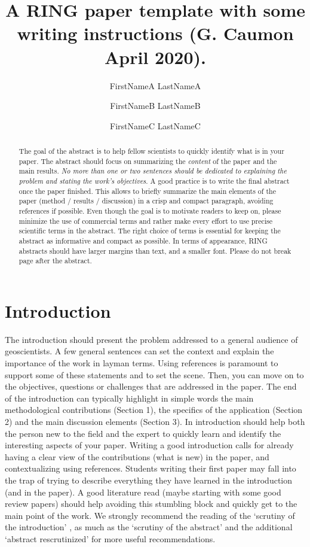 \documentclass[final]{ring}
\title{A RING paper template with some writing instructions \newline (G. Caumon April 2020).}
\author[1]{FirstNameA LastNameA}
\author[2]{FirstNameB LastNameB}
\author[1,2]{FirstNameC LastNameC}
\affil[1]{RING, GeoRessources / ENSG, Universit\'e de Lorraine / CNRS, F-54000 Nancy}
\affil[2]{Team, Laboratory, Organization, Zip code, Country}
\begin{document}
\maketitle

\begin{abstract}

The goal of the abstract is to help fellow scientists to quickly identify what is in your paper. The abstract should focus on summarizing the \emph{content} of the paper and the main results. \emph{No more than one or two sentences should be dedicated to explaining the problem and stating the work’s objectives}. A good practice is to write the final abstract once the paper finished. This allows to briefly summarize the main elements of the paper (method / results / discussion) in a crisp and compact paragraph, avoiding references if possible. Even though the goal is to motivate readers to keep on, please minimize the use of commercial terms and rather make every effort to use precise scientific terms in the abstract. The right choice of terms is essential for keeping the abstract as informative and compact as possible. In terms of appearance, RING abstracts should have larger margins than text, and a smaller font. Please do not break page after the abstract.

\end{abstract}


\section*{Introduction}

The introduction should present the problem addressed to a general audience of geoscientists. A few general sentences can set the context and explain the importance of the work in layman terms. Using references is paramount to support some of these statements and to set the scene. Then, you can move on to the objectives, questions or challenges that are addressed in the paper. The end of the introduction can typically highlight in simple words the main methodological contributions (Section 1), the specifics of the application (Section 2) and the main discussion elements (Section 3). 
In introduction should help both the person new to the field and the expert to quickly learn and identify the interesting aspects of your paper. Writing a good introduction calls for already having a clear view of the contributions (what is new) in the paper, and contextualizing using references. Students writing their first paper may fall into the trap of trying to describe everything they have learned in the introduction (and in the paper). A good literature read (maybe starting with some good review papers) should help avoiding this stumbling block and quickly get to the main point of the work. We strongly recommend the reading of the `scrutiny of the introduction' \citep{Claerbout1988S}, as much as the `scrutiny of the abstract' \citep{Landes1966BAAPG} and the additional `abstract rescrutinized' \citep{Lowman1998G} for more useful recommendations.
\end{document}
